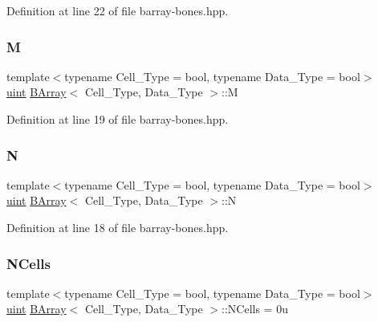 Definition at line 22 of file barray-\/bones.\+hpp.

\mbox{\label{class_b_array_a197359753fd1bc054a1a14f7641d3fd1}} 
\subsubsection{\texorpdfstring{M}{M}}
{\footnotesize\ttfamily template$<$typename Cell\+\_\+\+Type = bool, typename Data\+\_\+\+Type = bool$>$ \\
\hyperlink{typedefs_8hpp_a91ad9478d81a7aaf2593e8d9c3d06a14}{uint} \hyperlink{class_b_array}{B\+Array}$<$ Cell\+\_\+\+Type, Data\+\_\+\+Type $>$\+::M}



Definition at line 19 of file barray-\/bones.\+hpp.

\mbox{\label{class_b_array_a4b34ec8636c989efe80bbe3f1cea217e}} 
\subsubsection{\texorpdfstring{N}{N}}
{\footnotesize\ttfamily template$<$typename Cell\+\_\+\+Type = bool, typename Data\+\_\+\+Type = bool$>$ \\
\hyperlink{typedefs_8hpp_a91ad9478d81a7aaf2593e8d9c3d06a14}{uint} \hyperlink{class_b_array}{B\+Array}$<$ Cell\+\_\+\+Type, Data\+\_\+\+Type $>$\+::N}



Definition at line 18 of file barray-\/bones.\+hpp.

\mbox{\label{class_b_array_a31fd64c6b54408ca98e07abc9c4241c5}} 
\subsubsection{\texorpdfstring{N\+Cells}{NCells}}
{\footnotesize\ttfamily template$<$typename Cell\+\_\+\+Type = bool, typename Data\+\_\+\+Type = bool$>$ \\
\hyperlink{typedefs_8hpp_a91ad9478d81a7aaf2593e8d9c3d06a14}{uint} \hyperlink{class_b_array}{B\+Array}$<$ Cell\+\_\+\+Type, Data\+\_\+\+Type $>$\+::N\+Cells = 0u}




